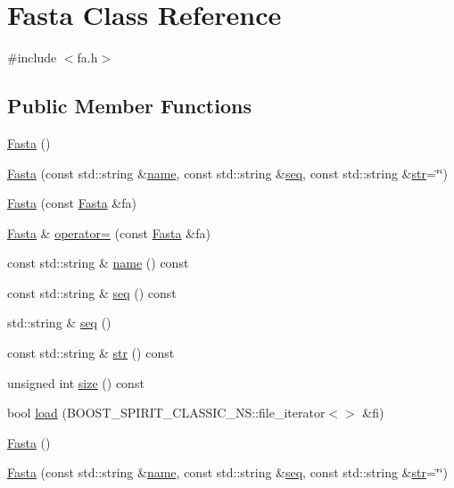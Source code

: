 \hypertarget{class_fasta}{\section{Fasta Class Reference}
\label{class_fasta}
}


{\ttfamily \#include $<$fa.\+h$>$}

\subsection*{Public Member Functions}
\begin{DoxyCompactItemize}
\item 
\hyperlink{class_fasta_a1bc28bad95d72941de20ddfa66ea57fc}{Fasta} ()
\item 
\hyperlink{class_fasta_ac3e0ae3f67fd24c90ac3c6631b3fc9a4}{Fasta} (const std\+::string \&\hyperlink{class_fasta_a0a0ce3f7b5f250952584263352cc5ebe}{name}, const std\+::string \&\hyperlink{class_fasta_a439c08f374209d61361f46f68fa5e419}{seq}, const std\+::string \&\hyperlink{class_fasta_a995ab959d5232d198d028dfb4b3c0868}{str}=\char`\"{}\char`\"{})
\item 
\hyperlink{class_fasta_a60e2870e7988c3c77bce04e8c4c32dbb}{Fasta} (const \hyperlink{class_fasta}{Fasta} \&fa)
\item 
\hyperlink{class_fasta}{Fasta} \& \hyperlink{class_fasta_a345279eb9dd0362f8eefdc85d8b8f4ad}{operator=} (const \hyperlink{class_fasta}{Fasta} \&fa)
\item 
const std\+::string \& \hyperlink{class_fasta_a0a0ce3f7b5f250952584263352cc5ebe}{name} () const 
\item 
const std\+::string \& \hyperlink{class_fasta_a439c08f374209d61361f46f68fa5e419}{seq} () const 
\item 
std\+::string \& \hyperlink{class_fasta_af12f7ad36ec0fdea3a974f1dfb1c12de}{seq} ()
\item 
const std\+::string \& \hyperlink{class_fasta_a995ab959d5232d198d028dfb4b3c0868}{str} () const 
\item 
unsigned int \hyperlink{class_fasta_a0e330e14f480642b2cbe5cee1eba8038}{size} () const 
\item 
bool \hyperlink{class_fasta_a19ec5134eb3fb370bd660213aa4b1db2}{load} (B\+O\+O\+S\+T\+\_\+\+S\+P\+I\+R\+I\+T\+\_\+\+C\+L\+A\+S\+S\+I\+C\+\_\+\+N\+S\+::file\+\_\+iterator$<$$>$ \&fi)
\item 
\hyperlink{class_fasta_a1bc28bad95d72941de20ddfa66ea57fc}{Fasta} ()
\item 
\hyperlink{class_fasta_ac3e0ae3f67fd24c90ac3c6631b3fc9a4}{Fasta} (const std\+::string \&\hyperlink{class_fasta_a0a0ce3f7b5f250952584263352cc5ebe}{name}, const std\+::string \&\hyperlink{class_fasta_a439c08f374209d61361f46f68fa5e419}{seq}, const std\+::string \&\hyperlink{class_fasta_a995ab959d5232d198d028dfb4b3c0868}{str}=\char`\"{}\char`\"{})
$$
\end{DoxyCompactItemize}
